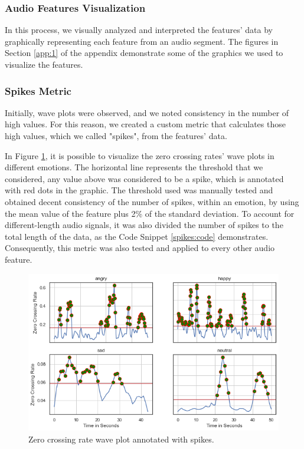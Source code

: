 \subsubsection{Audio Features Visualization}

In this process, we visually analyzed and interpreted the features' data by graphically representing each feature from an audio segment. The figures in Section \ref{app:1} of the appendix demonstrate some of the graphics we used to visualize the features.

\subsubsection{Spikes Metric}
\label{spikes:metric}

Initially, wave plots were observed, and we noted consistency in the number of high values. For this reason, we created a custom metric that calculates those high values, which we called "spikes", from the features' data.

In Figure \ref{fig:zcrSpikes}, it is possible to visualize the zero crossing rates' wave plots in different emotions. The horizontal line represents the threshold that we considered, any value above was considered to be a spike, which is annotated with red dots in the graphic. The threshold used was manually tested and obtained decent consistency of the number of spikes, within an emotion, by using the mean value of the feature plus 2\% of the standard deviation. To account for different-length audio signals, it was also divided the number of spikes to the total length of the data, as the Code Snippet \ref{spikes:code} demonstrates. Consequently, this metric was also tested and applied to every other audio feature.

\begin{figure}[H]
	\centering
	\includegraphics[width=.7\textwidth]{figs/4_1_traditional/zcr_waveplot_spikes.png}
	\caption{Zero crossing rate wave plot annotated with spikes.}
	\label{fig:zcrSpikes}
\end{figure}

